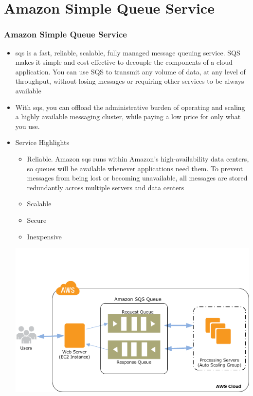 \documentclass{beamer}
\begin{document}
\section{Amazon Simple Queue Service}
\begin{frame}
\frametitle{Amazon Simple Queue Service}
\begin{itemize}
\item \acrfull{sqs} is a fast, reliable, scalable, fully managed message queuing service. SQS makes it simple and cost-effective to decouple the components of a cloud application. You can use SQS to transmit any volume of data, at any level of throughput, without losing messages or requiring other services to be always available

\item With \acrshort{sqs}, you can offload the administrative burden of operating and scaling a highly available messaging cluster, while paying a low price for only what you use.

\item Service Highlights
\begin{itemize}
\item Reliable. Amazon \acrshort{sqs} runs within Amazon’s high-availability data centers, so queues will be available whenever applications need them. To prevent messages from being lost or becoming unavailable, all messages are stored redundantly across multiple servers and data centers
\item Scalable
\item Secure
\item Inexpensive
\end{itemize}

\includegraphics[width=0.75 \textwidth]{sqs-as-workflow.png}
\end{itemize}
\end{frame}
\end{document}
